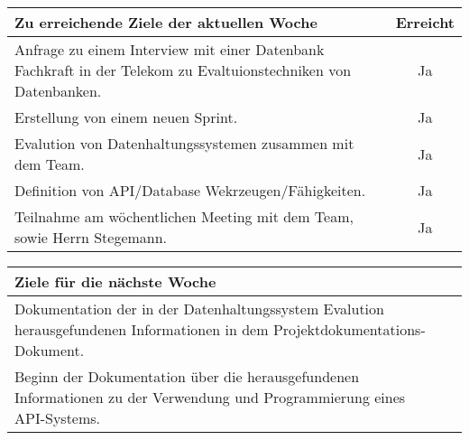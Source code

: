 \begin{tabularx}{\textwidth}{Xc}
    \arrayrulecolor{OliveGreen}
    \toprule
    {\bfseries Zu erreichende Ziele der aktuellen Woche} & {\bfseries Erreicht} \\
    \midrule[2pt]
    Anfrage zu einem Interview mit einer Datenbank Fachkraft in der
    Telekom zu Evaltuionstechniken von Datenbanken.  & Ja  \\
    \rowcolor{OliveGreen!15}
    Erstellung von einem neuen Sprint.  & Ja  \\
    \rowcolor{White}
    Evalution von Datenhaltungssystemen zusammen mit dem Team.  & Ja  \\
    \rowcolor{OliveGreen!15}
    Definition von API/Database Wekrzeugen/Fähigkeiten.  & Ja  \\
    \rowcolor{White}
    Teilnahme am wöchentlichen Meeting mit dem Team, sowie Herrn
    Stegemann.  & Ja \\
    \bottomrule[2pt]
\end{tabularx}
%
\vspace{1cm}
%
\begin{tabularx}{\textwidth}{Xc}
    \arrayrulecolor{OliveGreen}
    \toprule
    {\bfseries Ziele für die nächste Woche}              &                      \\
    \midrule[2pt]
    Dokumentation der in der Datenhaltungssystem Evalution
    herausgefundenen Informationen in dem 
    Projektdokumentations-Dokument.  & \\
    \rowcolor{OliveGreen!15}
    Beginn der Dokumentation über die herausgefundenen Informationen
    zu der Verwendung und Programmierung eines API-Systems.  &  \\
\end{tabularx}
